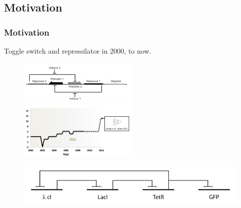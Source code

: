 \documentclass{beamer}
\begin{document}

\subsection{Motivation}

\begin{frame}
\frametitle{Motivation}

Toggle switch and repressilator in 2000, to now.
 
\begin{figure}[ht]
  \includegraphics[width=0.5\textwidth]{DNA_toggle.png}
  \hfill
  \includegraphics[width=0.5\textwidth]{circuit_complexity.png}
\end{figure}

\begin{figure}[ht]
  \includegraphics[scale=0.4]{repressilator.png}
\end{figure}
\end{frame}
\end{document}
